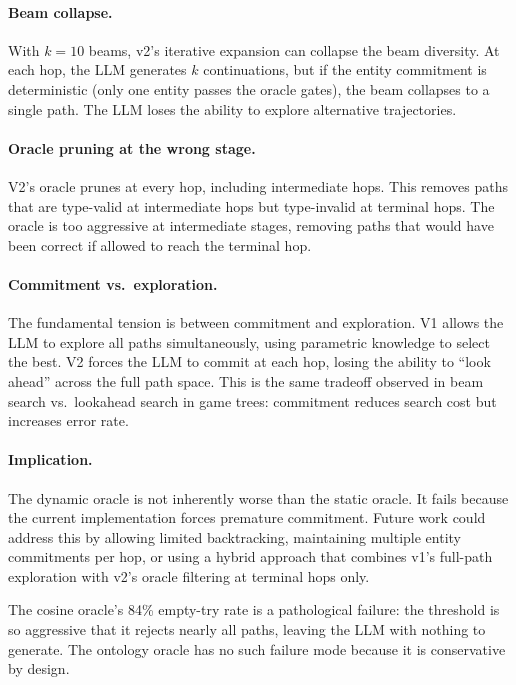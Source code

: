 \documentclass[11pt,twoside]{article}
\begin{document}
\paragraph{Beam collapse.} With $k=10$ beams, v2's iterative expansion can collapse the beam diversity. At each hop, the LLM generates $k$ continuations, but if the entity commitment is deterministic (only one entity passes the oracle gates), the beam collapses to a single path. The LLM loses the ability to explore alternative trajectories.

\paragraph{Oracle pruning at the wrong stage.} V2's oracle prunes at every hop, including intermediate hops. This removes paths that are type-valid at intermediate hops but type-invalid at terminal hops. The oracle is too aggressive at intermediate stages, removing paths that would have been correct if allowed to reach the terminal hop.

\paragraph{Commitment vs.\ exploration.} The fundamental tension is between commitment and exploration. V1 allows the LLM to explore all paths simultaneously, using parametric knowledge to select the best. V2 forces the LLM to commit at each hop, losing the ability to ``look ahead'' across the full path space. This is the same tradeoff observed in beam search vs.\ lookahead search in game trees: commitment reduces search cost but increases error rate.

\paragraph{Implication.} The dynamic oracle is not inherently worse than the static oracle. It fails because the current implementation forces premature commitment. Future work could address this by allowing limited backtracking, maintaining multiple entity commitments per hop, or using a hybrid approach that combines v1's full-path exploration with v2's oracle filtering at terminal hops only.

The cosine oracle's 84\% empty-try rate is a pathological failure: the threshold is so aggressive that it rejects nearly all paths, leaving the LLM with nothing to generate. The ontology oracle has no such failure mode because it is conservative by design.
\end{document}
